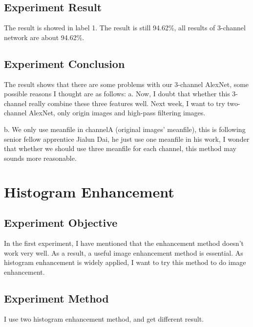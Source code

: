 \documentclass{article}
\begin{document}
\subsection{Experiment Result}
The result is showed in label 1. The result is still 94.62\%, all results of 3-channel network are about 94.62\%.
\subsection{Experiment Conclusion}
The result shows that there are some problems with our 3-channel AlexNet, some possible reasons I thought are as follows:
a. Now, I doubt that whether this 3-channel really combine these three features well. Next week, I want to try two-channel AlexNet, only origin images and high-pass filtering images. 

b. We only use meanfile in channelA (original images' meanfile), this is following senior fellow apprentice Jialun Dai, he just use one meanfile in his work, I wonder that whether we should use three meanfile for each channel, this method may sounds more reasonable.


\section{Histogram Enhancement}
\subsection{Experiment Objective}
In the first experiment, I have mentioned that the enhancement method doesn't work very well. As a result, a useful image enhancement method is essential. As histogram enhancement is widely applied, I want to try this method to do image enhancement.
\subsection{Experiment Method}
I use two histogram enhancement method, and get different result. 
\end{document}
